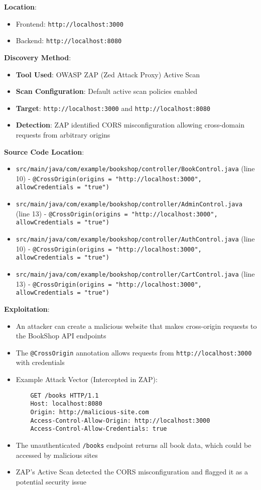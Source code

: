 \documentclass[]{UCD_CS_FYP_Report}
\begin{document}
\textbf{Location}: 
\begin{itemize}
    \item Frontend: \texttt{http://localhost:3000}
    \item Backend: \texttt{http://localhost:8080}
\end{itemize}

\textbf{Discovery Method}: 
\begin{itemize}
    \item \textbf{Tool Used}: OWASP ZAP (Zed Attack Proxy) Active Scan
    \item \textbf{Scan Configuration}: Default active scan policies enabled
    \item \textbf{Target}: \texttt{http://localhost:3000} and \texttt{http://localhost:8080}
    \item \textbf{Detection}: ZAP identified CORS misconfiguration allowing cross-domain requests from arbitrary origins
\end{itemize}

\textbf{Source Code Location}: 
\begin{itemize}
    \item \texttt{src/main/java/com/example/bookshop/controller/BookControl.java} (line 10) - \texttt{@CrossOrigin(origins = "http://localhost:3000", allowCredentials = "true")}
    \item \texttt{src/main/java/com/example/bookshop/controller/AdminControl.java} (line 13) - \texttt{@CrossOrigin(origins = "http://localhost:3000", allowCredentials = "true")}
    \item \texttt{src/main/java/com/example/bookshop/controller/AuthControl.java} (line 10) - \texttt{@CrossOrigin(origins = "http://localhost:3000", allowCredentials = "true")}
    \item \texttt{src/main/java/com/example/bookshop/controller/CartControl.java} (line 13) - \texttt{@CrossOrigin(origins = "http://localhost:3000", allowCredentials = "true")}
\end{itemize}

\textbf{Exploitation}:
\begin{itemize}
    \item An attacker can create a malicious website that makes cross-origin requests to the BookShop API endpoints
    \item The \texttt{@CrossOrigin} annotation allows requests from \texttt{http://localhost:3000} with credentials
    \item Example Attack Vector (Intercepted in ZAP):
    \begin{verbatim}
    GET /books HTTP/1.1
    Host: localhost:8080
    Origin: http://malicious-site.com
    Access-Control-Allow-Origin: http://localhost:3000
    Access-Control-Allow-Credentials: true
    \end{verbatim}
    \item The unauthenticated \texttt{/books} endpoint returns all book data, which could be accessed by malicious sites
    \item ZAP's Active Scan detected the CORS misconfiguration and flagged it as a potential security issue
\end{itemize}
\end{document}
